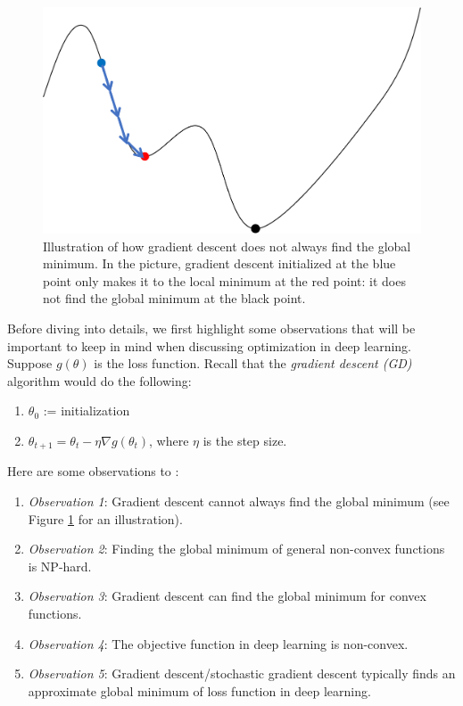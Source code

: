 \begin{figure}[H]
    \centering
    \includegraphics[scale = 0.3]{figures/gradient_descent.png}
    \caption{Illustration of how gradient descent does not always find the global minimum. In the picture, gradient descent initialized at the blue point only makes it to the local minimum at the red point: it does not find the global minimum at the black point.}
    \label{lec10:fig:gradient_descent}
\end{figure}
Before diving into details, we first highlight some observations that will be important to keep in mind when discussing optimization in deep learning. Suppose $g(\theta)$ is the loss function. Recall that the \textit{gradient descent (GD)} algorithm would do the following:
\begin{enumerate}
    \item $\theta_0$ := initialization
    \item $\theta_{t + 1} = \theta_t - \eta\nabla g(\theta_t)$, where $\eta$ is the step size.
\end{enumerate}
Here are some observations to :
\begin{enumerate}
    \item[] \textit{Observation 1}: Gradient descent cannot always find the global minimum (see Figure \ref{lec10:fig:gradient_descent} for an illustration).
    \item[] \textit{Observation 2}: Finding the global minimum of general non-convex functions is NP-hard.
    \item[] \textit{Observation 3}: Gradient descent can find the global minimum for convex functions.
    \item[] \textit{Observation 4}: The objective function in deep learning is non-convex.
    \item[] \textit{Observation 5}: Gradient descent/stochastic gradient descent typically finds an approximate global minimum of loss function in deep learning.
\end{enumerate}


